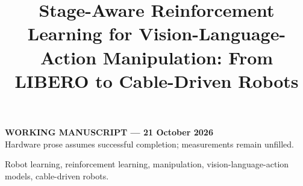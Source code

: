 \documentclass[letterpaper,journal]{IEEEtran}
\begin{document}
\title{Stage-Aware Reinforcement Learning for Vision-Language-Action Manipulation: From LIBERO to Cable-Driven Robots}
\author{\vspace{1em}}
\maketitle
\begin{center}\small\textbf{WORKING MANUSCRIPT --- 21 October 2026}\\
Hardware prose assumes successful completion; measurements remain unfilled.
\end{center}

\begin{IEEEkeywords}
Robot learning, reinforcement learning, manipulation, vision-language-action models, cable-driven robots.
\end{IEEEkeywords}











\end{document}
